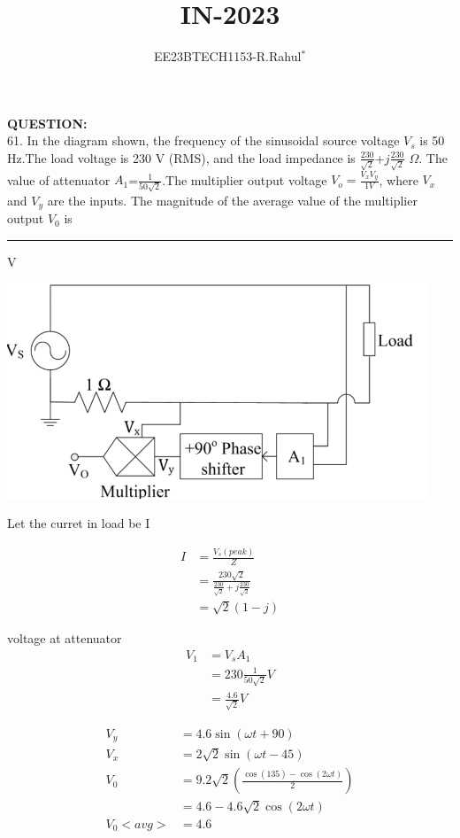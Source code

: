 \documentclass[journal,12pt,twocolumn]{IEEEtran}
\theoremstyle{remark}
\begin{document}

\vspace{3cm}
\title{\textbf{IN-2023}}
\author{EE23BTECH1153-R.Rahul$^{*}$%
}
\maketitle
\newpage
\bigskip

\textbf{QUESTION:}\\
61. In the diagram shown, the frequency of the sinusoidal source voltage $V_s$ is 50 Hz.The load voltage is 230 V (RMS), and the load impedance is $\frac{230}{\sqrt{2}}$+$j\frac{230}{\sqrt{2}}$ $\Omega$. The value of attenuator $A_1$=$\frac{1}{50\sqrt{2}}$.The multiplier output voltage $V_o=\frac{V_xV_y}{1V}$, where $V_x$ and $V_y$ are the inputs. The magnitude of the average value of the multiplier output $V_0$ is \hspace{3cm}\rule{5cm}{0.4pt} V

\vspace{2cm}
 \includegraphics[width=0.8\linewidth]{Gate.png} 


Let the curret in load be I
\begin{center}
\begin{align}
     I &=\frac{V_s(peak)}{Z}\\
     &=\frac{230\sqrt{2}}{\frac{230}{\sqrt{2}}+j\frac{230}{\sqrt{2}}} \\
     &=\sqrt{2}(1-j)
\end{align}
\end{center}
voltage at attenuator 
\begin{align}
    V_1&=V_sA_1\\
    &=230\frac{1}{50\sqrt{2}}V\\
    &=\frac{4.6}{\sqrt{2}}V
\end{align}
\begin{center}
    \begin{align}
        V_y&=4.6\sin(\omega t+90)\\
        V_x&=2\sqrt{2}\sin(\omega t-45)\\
        V_0&=9.2\sqrt{2}(\frac{\cos(135)-\cos(2\omega t)}{2})\\
        &=4.6-4.6\sqrt{2}\cos(2\omega t)\\
        V_0<avg>&=4.6
    \end{align}
\end{center}
\end{document}
